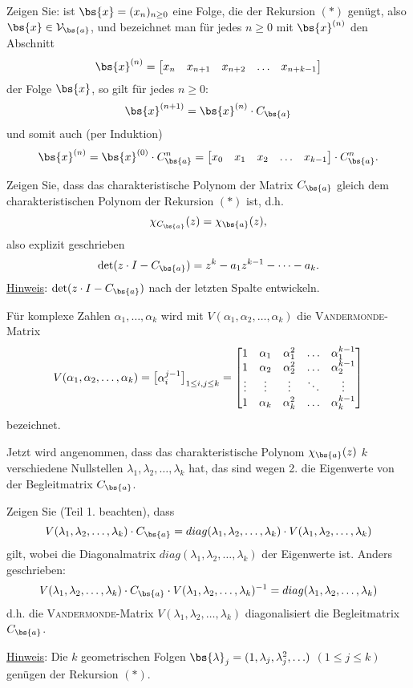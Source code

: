 \begin{flushenum}
\item Zeigen Sie: ist $\bs{x} = (x_n)_{n \geq 0}$  eine Folge, die der Rekursion $(*)$
	genügt, also  $\bs{x} \in \mathcal{V}_{\bs{a}}$, 
	und bezeichnet man für jedes $n \geq 0$ mit $\bs{x}^{(n)}$ den Abschnitt
	\[
	\bs{x}^{(n)} = \begin{bmatrix} x_n & x_{n+1}  & x_{n+2} & \ldots & x_{n+k-1} \end{bmatrix}
	\]
	der Folge $\bs{x}$, so gilt für jedes $n \geq 0$:
	\[
	\bs{x}^{(n+1)} = \bs{x}^{(n)} \cdot C_{\bs{a}}
	\]
	und somit auch (per Induktion)
	\[
	\bs{x}^{(n)} = \bs{x}^{(0)} \cdot C_{\bs{a}}^n = 
	\begin{bmatrix} x_{0} & x_{1}  & x_{2} & \ldots & x_{k-1} \end{bmatrix}\cdot C_{\bs{a}}^n .
	\]
\item Zeigen Sie, dass das charakteristische Polynom der Matrix $C_{\bs{a}}$ 
	gleich dem charakteristischen Polynom der Rekursion $(*)$ ist, d.h.
	\[
	\chi_{C_{\bs{a}}}(z) = \chi_{\bs{a}}(z),
	\]
	also explizit geschrieben
	\[
	\det (z \cdot I - C_{\bs{a}}) = z^k - a_1 z^{k-1}- \cdots - a_k.
	\]
	\underline{Hinweis}: $\det (z \cdot I - C_{\bs{a}})$ nach der letzten Spalte entwickeln.
	
\item Für  komplexe Zahlen $\alpha_1, \ldots , \alpha_k$ wird mit
	$V(\alpha_1,\alpha_2,\ldots,\alpha_k)$ die \textsc{Vandermonde}-Matrix
	\[
	V(\alpha_1,\alpha_2,\ldots,\alpha_k) = 
		\begin{bmatrix}
			\alpha_i^{j-1}
		\end{bmatrix}_{1 \leq i,j \leq k}
	= \begin{bmatrix}
	1 & \alpha_1 & \alpha_1^2 & \ldots & \alpha_1^{k-1} \cr
	1 & \alpha_2 & \alpha_2^2 & \ldots & \alpha_2^{k-1} \cr
	\vdots & \vdots & \vdots & \ddots & \vdots \cr
	1 & \alpha_k & \alpha_k^2 & \ldots & \alpha_k^{k-1} 
	\end{bmatrix}
	\]
	bezeichnet.
	
	Jetzt wird angenommen, dass das charakteristische Polynom $\chi_{\bs{a}}(z)$
	$k$ verschiedene Nullstellen $\lambda_1,\lambda_2,\ldots,\lambda_k$ hat, das sind 
	wegen 2. die Eigenwerte von der Begleitmatrix $C_{\bs{a}}$.
	
	Zeigen Sie (Teil 1. beachten), dass
	\[
	V(\lambda_1,\lambda_2,\ldots,\lambda_k) \cdot C_{\bs{a}} =
	diag(\lambda_1,\lambda_2,\ldots,\lambda_k) \cdot V(\lambda_1,\lambda_2,\ldots,\lambda_k)
	\]
	gilt, wobei die Diagonalmatrix $diag(\lambda_1,\lambda_2,\ldots,\lambda_k)$ der Eigenwerte ist.
	Anders geschrieben:
	\[
	V(\lambda_1,\lambda_2,\ldots,\lambda_k) \cdot C_{\bs{a}} \cdot V(\lambda_1,\lambda_2,\ldots,\lambda_k)^{-1}= 
	diag(\lambda_1,\lambda_2,\ldots,\lambda_k)
	\]
	d.h. die \textsc{Vandermonde}-Matrix $V(\lambda_1,\lambda_2,\ldots,\lambda_k)$
	diagonalisiert die Begleitmatrix $C_{\bs{a}}$.
	
	
	\underline{Hinweis}:  Die $k$ geometrischen Folgen 
	$\bs{\lambda}_j = (1,\lambda_j,\lambda_j^2, \ldots)$
	$(1 \leq j \leq k)$ genügen der Rekursion $(*)$.

\end{flushenum}
